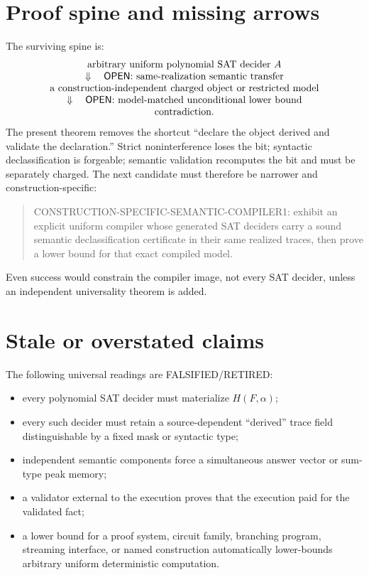 \documentclass[11pt]{article}
\newcommand{\OPEN}{\textsf{OPEN}}
\newcommand{\RET}{\textsf{FALSIFIED/RETIRED}}
\begin{document}
\section*{Proof spine and missing arrows}
The surviving spine is:
\[
\begin{array}{c}
\text{arbitrary uniform polynomial SAT decider }A\\
\Downarrow\quad\text{\OPEN: same-realization semantic transfer}\\
\text{a construction-independent charged object or restricted model}\\
\Downarrow\quad\text{\OPEN: model-matched unconditional lower bound}\\
\text{contradiction.}
\end{array}
\]
The present theorem removes the shortcut ``declare the object derived and
validate the declaration.''  Strict noninterference loses the bit; syntactic
declassification is forgeable; semantic validation recomputes the bit and must
be separately charged.  The next candidate must therefore be narrower and
construction-specific:
\begin{quote}
\textsf{CONSTRUCTION-SPECIFIC-SEMANTIC-COMPILER1}: exhibit an explicit uniform
compiler whose generated SAT deciders carry a sound semantic declassification
certificate in their same realized traces, then prove a lower bound for that
exact compiled model.
\end{quote}
Even success would constrain the compiler image, not every SAT decider, unless
an independent universality theorem is added.

\section*{Stale or overstated claims}
The following universal readings are \RET{}:
\begin{itemize}
\item every polynomial SAT decider must materialize $H(F,\alpha)$;
\item every such decider must retain a source-dependent ``derived'' trace
field distinguishable by a fixed mask or syntactic type;
\item independent semantic components force a simultaneous answer vector or
sum-type peak memory;
\item a validator external to the execution proves that the execution paid for
the validated fact;
\item a lower bound for a proof system, circuit family, branching program,
streaming interface, or named construction automatically lower-bounds arbitrary
uniform deterministic computation.
\end{itemize}
\end{document}
